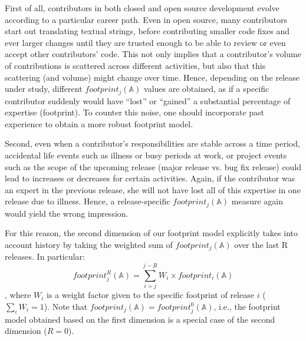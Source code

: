 First of all, contributors in both closed and open source development evolve according to a particular career path. Even in open source, many contributors start out translating textual strings, before contributing smaller code fixes and ever larger changes until they are trusted enough to be able to review or even accept other contributors' code. %
This not only implies that a contributor's volume of contributions is scattered across different activities, but also that this scattering (and volume) might change over time. Hence, depending on the release under study, different $footprint_j(\mathbb{A})$ values are obtained, as if a specific contributor suddenly would have ``lost'' or ``gained'' a substantial percentage of expertise (footprint). To counter this noise, one should incorporate past experience to obtain a more robust footprint model.%

Second, even when a contributor's responsibilities are stable across a time period, accidental life events such as illness or busy periods at work, or project events such as the scope of the upcoming release (major release vs. bug fix release) could lead to increases or decreases for certain activities. Again, if the contributor was an expert in the previous release, she will not have lost all of this expertise in one release due to illness. Hence, a release-specific $footprint_j(\mathbb{A})$ measure again would yield the wrong impression.

For this reason, the second dimension of our footprint model explicitly takes into account history by taking the weighted sum of $footprint_j(\mathbb{A})$ over the last R releases. In particular: $$footprint_j^R(\mathbb{A})=\sum_{i=j}^{j-R} W_i \times footprint_i(\mathbb{A})$$, where $W_i$ is a weight factor given to the specific footprint of release $i$ ($\sum_i W_i = 1$). Note that $footprint_j(\mathbb{A})=footprint_j^0(\mathbb{A})$, i.e., the footprint model obtained based on the first dimension is a special case of the second dimension ($R=0$).

